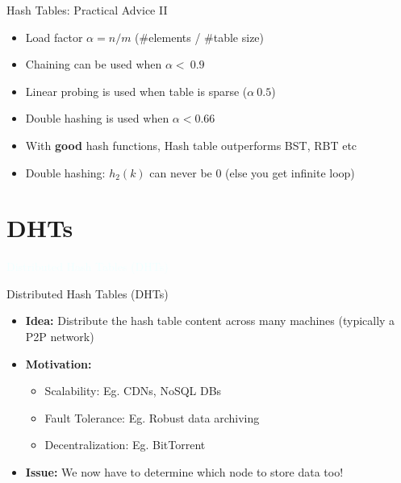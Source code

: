 \documentclass{beamer}
\newcommand{\thblue}[1]{{\Huge {\textcolor{azure}{#1}}}}
\begin{document}
\begin{frame}{Hash Tables: Practical Advice II}
    \begin{itemize}
        \item Load factor $\alpha = n/m$ (\#elements / \#table size)
        \item Chaining can be used when $\alpha < ~0.9$
        \item Linear probing is used when table is sparse ($\alpha ~ 0.5$)
        \item Double hashing is used when $\alpha < 0.66$
        \item With {\bf good} hash functions, Hash table outperforms BST, RBT etc
        \item Double hashing: $h_2(k)$ can never be $0$ (else you get infinite loop)
    \end{itemize}
\end{frame}



\section{DHTs}
\begin{frame}{}
    \begin{center}
        \thblue{Distributed Hash Tables (DHTs)}
    \end{center}
\end{frame}

\begin{frame}{Distributed Hash Tables (DHTs)}
    \begin{itemize}
        \item {\bf Idea:} Distribute the hash table content across many machines (typically a P2P network) 
        \item {\bf Motivation:}
        \begin{itemize}
            \item Scalability: Eg. CDNs, NoSQL DBs
            \item Fault Tolerance: Eg. Robust data archiving 
            \item Decentralization: Eg. BitTorrent
        \end{itemize}
        \item {\bf Issue:} We now have to determine which node to store data too!
    \end{itemize}
\end{frame}
\end{document}
